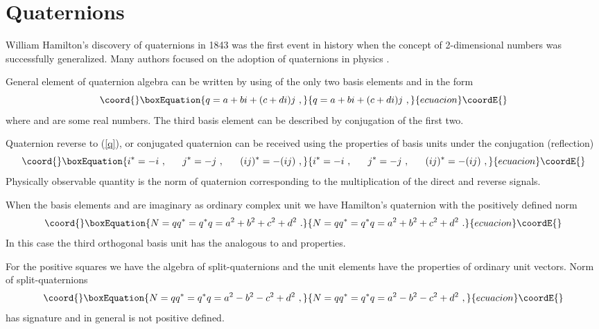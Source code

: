 \documentclass[a4paper,12pt]{article}
\begin{document}

\section{Quaternions}

William Hamilton's discovery of quaternions in 1843 was the first event in history when 
the concept of 2-dimensional numbers was successfully generalized. Many authors focused 
on the adoption of quaternions in physics \cite{Sa,Qua}. 

General element of quaternion algebra can be written by using of the only two basis 
elements \coordHE{} and \coordHE{} in the form
\begin{equation}\coord{}\boxEquation{ \label{q}
q = a + bi + (c + di)j ~,
}{ q = a + bi + (c + di)j ~,
}{ecuacion}\coordE{}\end{equation}
where \coordHE{} and \coordHE{} are some real numbers. The third basis element \coordHE{} can be 
described by conjugation of the first two.

Quaternion reverse to (\ref{q}), or conjugated quaternion \coordHE{} can be received using 
the properties of basis units under the conjugation (reflection)
\begin{equation}\coord{}\boxEquation{ \label{*}
i^* = - i~, ~~~~~j^* = - j~, ~~~~~ (ij)^* = - (ij) ~,
}{ i^* = - i~, ~~~~~j^* = - j~, ~~~~~ (ij)^* = - (ij) ~,
}{ecuacion}\coordE{}\end{equation}
Physically observable quantity is the norm of quaternion \coordHE{} corresponding to 
the multiplication of the direct and reverse signals.

When the basis elements \coordHE{} and \coordHE{} are imaginary \coordHE{} as ordinary complex 
unit we have Hamilton's quaternion with the positively defined norm 
\begin{equation}\coord{}\boxEquation{ \label{Nq+}
N = qq^* = q^*q = a^2 + b^2 + c^2 +d^2 ~.
}{ N = qq^* = q^*q = a^2 + b^2 + c^2 +d^2 ~.
}{ecuacion}\coordE{}\end{equation} 
In this case the third orthogonal basis unit \coordHE{} has the analogous to \coordHE{} and \coordHE{} 
properties. 

For the positive squares \coordHE{} we have the algebra of split-quaternions and 
the unit elements \coordHE{} have the properties of ordinary unit vectors. Norm of 
split-quaternions
\begin{equation}\coord{}\boxEquation{ \label{Nq-}
N = qq^* = q^*q = a^2 - b^2 - c^2 + d^2 ~, 
}{ N = qq^* = q^*q = a^2 - b^2 - c^2 + d^2 ~, 
}{ecuacion}\coordE{}\end{equation}
has \coordHE{} signature and in general is not positive defined. 
\end{document}
